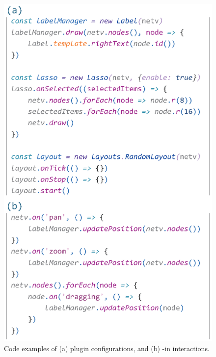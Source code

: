 \begin{figure}
\includegraphics[width=\linewidth]{fig/ex8.eps}
\caption{
    Code examples of (a) plugin configurations, and (b) -in interactions.
}
\label{fig:ex8}
\end{figure}



